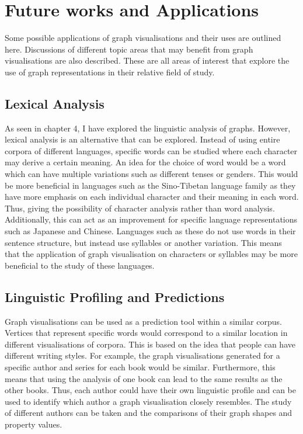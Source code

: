 \section{Future works and Applications}
Some possible applications of graph visualisations and their uses are outlined here. Discussions of different topic areas that may benefit from graph visualisations are also described. These are all areas of interest that explore the use of graph representations in their relative field of study.

\subsection{Lexical Analysis}
As seen in chapter 4, I have explored the linguistic analysis of graphs. However, lexical analysis is an alternative that can be explored. Instead of using entire corpora of different languages, specific words can be studied where each character may derive a certain meaning. An idea for the choice of word would be a word which can have multiple variations such as different tenses or genders. This would be more beneficial in languages such as the Sino-Tibetan language family as they have more emphasis on each individual character and their meaning in each word. Thus, giving the possibility of character analysis rather than word analysis. Additionally, this can act as an improvement for specific language representations such as Japanese and Chinese. Languages such as these do not use words in their sentence structure, but instead use syllables \cite{peng2006temporal} or another variation. This means that the application of graph visualisation on characters or syllables may be more beneficial to the study of these languages.

\subsection{Linguistic Profiling and Predictions}
Graph visualisations can be used as a prediction tool within a similar corpus. Vertices that represent specific words would correspond to a similar location in different visualisations of corpora. This is based on the idea that people can have different writing styles. For example, the graph visualisations generated for a specific author and series for each book would be similar. Furthermore, this means that using the analysis of one book can lead to the same results as the other books. Thus, each author could have their own linguistic profile and can be used to identify which author a graph visualisation closely resembles. The study of different authors can be taken and the comparisons of their graph shapes and property values.

